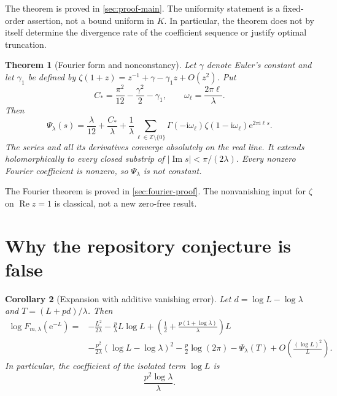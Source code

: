 \documentclass[11pt,a4paper]{article}
\numberwithin{equation}{section}
\newtheorem{theorem}{Theorem}[section]
\newtheorem{corollary}[theorem]{Corollary}
\theoremstyle{definition}
\newcommand{\Z}{\mathbb Z}
\newcommand{\ii}{\mathrm i}
\newcommand{\ee}{\mathrm e}
\begin{document}
The theorem is proved in \cref{sec:proof-main}. The uniformity statement is a fixed-order assertion, not a bound uniform in $K$. In particular, the theorem does not by itself determine the divergence rate of the coefficient sequence or justify optimal truncation.

\begin{theorem}[Fourier form and nonconstancy]
\label{thm:fourier}
Let $\gamma$ denote Euler's constant and let $\gamma_1$ be defined by
$\zeta(1+z)=z^{-1}+\gamma-\gamma_1z+O(z^2)$. Put
\begin{equation}
 C_* =\frac{\pi^2}{12}-\frac{\gamma^2}{2}-\gamma_1,
 \qquad \omega_\ell=\frac{2\pi\ell}{\lambda}.
 \label{eq:Cstar}
\end{equation}
Then
\begin{equation}
 \Psi_\lambda(s)=\frac\lambda{12}+\frac{C_*}{\lambda}
 +\frac1\lambda\sum_{\ell\in\Z\setminus\{0\}}
 \Gamma(-\ii\omega_\ell)\zeta(1-\ii\omega_\ell)
 \ee^{2\pi\ii\ell s}.
 \label{eq:fourier}
\end{equation}
The series and all its derivatives converge absolutely on the real line. It extends holomorphically to every closed substrip of $|\operatorname{Im}s|<\pi/(2\lambda)$. Every nonzero Fourier coefficient is nonzero, so $\Psi_\lambda$ is not constant.
\end{theorem}

The Fourier theorem is proved in \cref{sec:fourier-proof}. The nonvanishing input for $\zeta$ on $\operatorname{Re}z=1$ is classical, not a new zero-free result.

\section{Why the repository conjecture is false}
\label{sec:correction}

\begin{corollary}[Expansion with additive vanishing error]
\label{cor:logform}
Let $d=\log L-\log\lambda$ and $T=(L+pd)/\lambda$. Then
\begin{equation}
\begin{split}
 \log F_{m,\lambda}(\ee^{-L})={}&
 -\frac{L^2}{2\lambda}-\frac p\lambda L\log L
 +\left(\frac12+\frac{p(1+\log\lambda)}\lambda\right)L\\
 &-\frac{p^2}{2\lambda}(\log L-\log\lambda)^2
 -\frac p2\log(2\pi)-\Psi_\lambda(T)
 +O\left(\frac{(\log L)^2}{L}\right).
\end{split}
\label{eq:Lform}
\end{equation}
In particular, the coefficient of the isolated term $\log L$ is
\begin{equation}
 \boxed{\displaystyle\frac{p^2\log\lambda}{\lambda}.}
 \label{eq:missing}
\end{equation}
\end{corollary}
\end{document}
